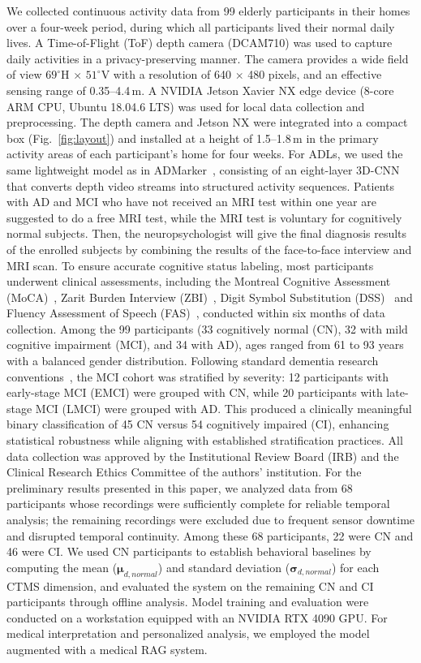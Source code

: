 \documentclass[sigconf, anonymous, 9pt, nonacm]{acmart}
\begin{document}
We collected continuous activity data from 99 elderly participants in their homes over a four-week period, during which all participants lived their normal daily lives. A Time-of-Flight (ToF) depth camera (DCAM710) was used to capture daily activities in a privacy-preserving manner. The camera provides a wide field of view $69^{\circ}$H $\times$ $51^{\circ}$V with a resolution of 640 $\times$ 480 pixels, and an effective sensing range of 0.35–4.4\,m. A NVIDIA Jetson Xavier NX edge device (8-core ARM CPU, Ubuntu 18.04.6 LTS) was used for local data collection and preprocessing. The depth camera and Jetson NX were integrated into a compact box (Fig.~\ref{fig:layout}) and installed at a height of 1.5–1.8\,m in the primary activity areas of each participant's home for four weeks.
For ADLs, we used the same lightweight model as in ADMarker~\cite{ouyang2024ADMarker}, consisting of an eight-layer 3D-CNN that converts depth video streams into structured activity sequences. Patients with AD and MCI who have not received
an MRI test within one year are suggested to do a free MRI
test, while the MRI test is voluntary for cognitively normal
subjects. Then, the neuropsychologist will give the final diagnosis results of the enrolled subjects by combining the
results of the face-to-face interview and MRI scan.
To ensure accurate cognitive status labeling, most participants underwent clinical assessments, including the Montreal Cognitive Assessment (MoCA)~\cite{Nasreddine2005MoCA}, Zarit Burden Interview (ZBI)~\cite{Zarit1980ZBI}, Digit Symbol Substitution (DSS)~\cite{Loreck1994DSS} and Fluency Assessment of Speech (FAS)~\cite{FAS}, conducted within six months of data collection.
Among the 99 participants (33 cognitively normal (CN), 32 with mild cognitive impairment (MCI), and 34 with AD), ages ranged from 61 to 93 years with a balanced gender distribution. Following standard dementia research conventions~\cite{Petersen2001MCI, Aisen2010ADNI}, the MCI cohort was stratified by severity: 12 participants with early-stage MCI (EMCI) were grouped with CN, while 20 participants with late-stage MCI (LMCI) were grouped with AD. This produced a clinically meaningful binary classification of 45 CN versus 54 cognitively impaired (CI), enhancing statistical robustness while aligning with established stratification practices.
All data collection was approved by the Institutional Review Board (IRB) and the Clinical Research Ethics Committee of the authors' institution. For the preliminary results presented in this paper, we analyzed data from 68 participants whose recordings were sufficiently complete for reliable temporal analysis; the remaining recordings were excluded due to frequent sensor downtime and disrupted temporal continuity. Among these 68 participants, 22 were CN and 46 were CI. We used CN participants to establish behavioral baselines by computing the mean ($\boldsymbol{\mu}_{d,normal}$) and standard deviation ($\boldsymbol{\sigma}_{d,normal}$) for each CTMS dimension, and evaluated the system on the remaining CN and CI participants through offline analysis.
Model training and evaluation were conducted on a workstation equipped with an NVIDIA RTX 4090 GPU. For medical interpretation and personalized analysis, we employed the  model augmented with a medical RAG system. 
\end{document}
